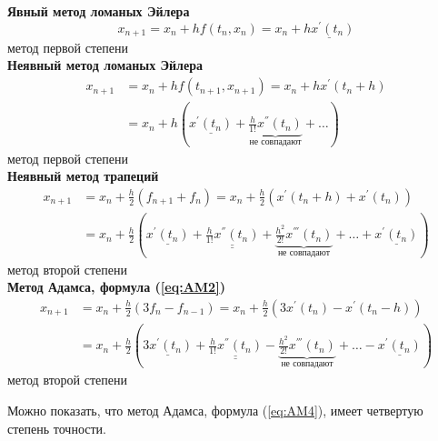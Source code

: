 \documentclass[a4paper,11pt]{article}
\begin{document}
\begin{importantblock}
  \begin{center}
    \textbf{Явный метод ломаных Эйлера}
    \[x_{n+1} = x_n + hf(t_n, x_n) = x_n + \underline{hx^{'}(t_n)}\]
    \footnotesize метод первой степени \\
    \normalsize \textbf{Неявный метод ломаных Эйлера}
    \begin{align*}
      x_{n+1} &= x_n + hf(t_{n+1}, x_{n+1}) = x_n + hx^{'}(t_n + h) \\
              &= x_n + h(\underline{x^{'}(t_n)} + \underbrace{\frac{h}{1!}x^{''}(t_n)}_{\text{не совпадают}} + \dots)
    \end{align*}
    \footnotesize метод первой степени \\
    \normalsize \textbf{Неявный метод трапеций}
    \begin{align*}
      x_{n+1} &= x_n + \frac{h}{2}(f_{n+1} + f_n) = x_n + \frac{h}{2}(x^{'}(t_n+h)+x^{'}(t_n)) \\
              &= x_n + \frac{h}{2}(\underline{x^{'}(t_n)} + \underline{\underline{\frac{h}{1!}x^{''}(t_n)}} + \underbrace{\frac{h^2}{2!}x^{'''}(t_n)}_{\text{не совпадают}} + \dots + \underline{x^{'}(t_n)})
    \end{align*}
    \footnotesize метод второй степени \\
    \normalsize \textbf{Метод Адамса, формула (\ref{eq:AM2})}
    \begin{align*}
      x_{n+1} &= x_n + \frac{h}{2}(3f_n - f_{n-1}) = x_n + \frac{h}{2}(3x^{'}(t_n)-x^{'}(t_n-h)) \\
              &= x_n + \frac{h}{2}(\underline{3x^{'}(t_n)} + \underline{\underline{\frac{h}{1!}x^{''}(t_n)}} - \underbrace{\frac{h^2}{2!}x^{'''}(t_n)}_{\text{не совпадают}} + \dots - \underline{x^{'}(t_n)})
    \end{align*}
    \footnotesize метод второй степени
  \end{center}
  Можно показать, что метод Адамса, формула (\ref{eq:AM4}), имеет четвертую степень точности.
\end{importantblock}
\end{document}
